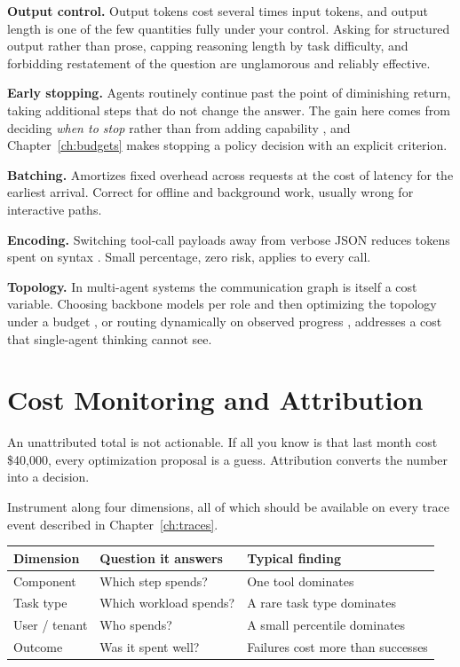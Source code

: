 \textbf{Output control.} Output tokens cost several times input tokens, and
output length is one of the few quantities fully under your control. Asking for
structured output rather than prose, capping reasoning length by task difficulty,
and forbidding restatement of the question are unglamorous and reliably effective.

\textbf{Early stopping.} Agents routinely continue past the point of diminishing
return, taking additional steps that do not change the answer. The gain here
comes from deciding \emph{when to stop} rather than from adding capability
\cite{budgettooluse2026}, and Chapter~\ref{ch:budgets} makes stopping a policy
decision with an explicit criterion.

\textbf{Batching.} Amortizes fixed overhead across requests at the cost of
latency for the earliest arrival. Correct for offline and background work,
usually wrong for interactive paths.

\textbf{Encoding.} Switching tool-call payloads away from verbose JSON reduces
tokens spent on syntax \cite{notation2026}. Small percentage, zero risk, applies
to every call.

\textbf{Topology.} In multi-agent systems the communication graph is itself a
cost variable. Choosing backbone models per role and then optimizing the topology
under a budget \cite{scmas2026}, or routing dynamically on observed progress
\cite{progrouter2026}, addresses a cost that single-agent thinking cannot see.

\section{Cost Monitoring and Attribution}

An unattributed total is not actionable. If all you know is that last month cost
\$40{,}000, every optimization proposal is a guess. Attribution converts the
number into a decision.

Instrument along four dimensions, all of which should be available on every trace
event described in Chapter~\ref{ch:traces}.

\begin{center}
\begin{tabular}{lll}
\toprule
Dimension & Question it answers & Typical finding \\
\midrule
Component & Which step spends? & One tool dominates \\
Task type & Which workload spends? & A rare task type dominates \\
User / tenant & Who spends? & A small percentile dominates \\
Outcome & Was it spent well? & Failures cost more than successes \\
\bottomrule
\end{tabular}
\end{center}

